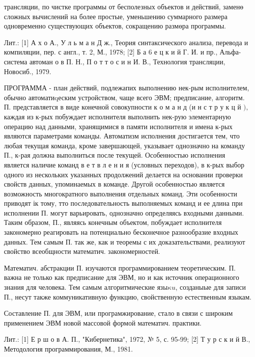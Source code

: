 \documentclass[10pt]{article}
\begin{document}
трансляции, по чистке программы от бесполезных объектов и действий, заменө сложных вычислений на более простые, уменьшению суммарного размера одновременно существующих объектов, сокращению размөра программы.



Лит.: [1] А х о А., У л ь м а н Д ж., Теория синтаксического анализа, перевода и компиляции, пер. с англ., т. 2, М., 1978; [2] Б а 6 е ц к и й Г. И. и пр., Альфа-система автоман о в П. Н., П о т т о с и н И. В., Технология трансляции, Новосиб., 1979.



ПРОГРАММА - план действий, подлежапих выполнению нек-рым исполнителем, обычно автоматиqеским устройством, чаще всего ЭВМ; предписание, алгоритм. П. представляется в виде конечной совокупности к о м а н д (и н с т р у к ц й $),$ каждая из к-рых побуждает исполнителя выполнить нек-рую элементарную операцию над данными, хранящимися в памяти исполнителя и имена к-рых являются параметрами команды. Автоматизм исполнения достигается тем, что любая текущая команда, кроме завершающей, указывает однозначно на команду П., к-рая должна выполниться после текущей. Особенностью исполнения является наличие команд в е т в л е н и я (условных переходов), в к-рых выбор одного из нескольких указанных продолжений делается на основании проверки свойств данных, упоминаемых в команде. Другой особенностью является возможность многократного выполнения отдельных команд. Эти особенности приводят ік тому, тто последовательность выполняемых команд и ее длина при исполнении П. могут варьировать, однозначно определяясь входными данными. Таким образом, П., являясь конечным объектом, побуждает исполнителя закономерно реагировать на потенциально бесконечное разнообразие входных данных. Тем самым П. так же, как и теоремы с их доказательствами, реализуют свойство всеобщности математич. закономерностей.



Математич. абстракции П. изучаются программированием теоретическим. П. важна не только как предписание для ЭВМ, но и как источник операционного знания для человека. Тем самым алгоритмические язы$\kappa u$, созданыые для записи П., несут также коммуникативную функцию, свойственную естественным языкам.



Составление П. для ЭВМ, или програмжирование, стало в связи с широким применением ЭВМ новой массовой формой математич. практики.



Лит.: [1] Е р ш о в А. П., "Кибернетика", 1972, № 5, с. 95-99; [2] Т у р с к и й В., Методология программирования, М., 1981.
\end{document}
